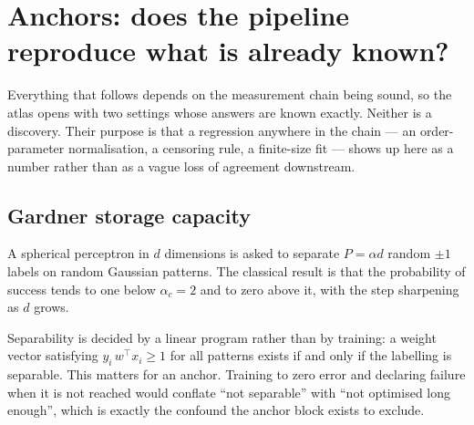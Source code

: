 \section{Anchors: does the pipeline reproduce what is already known?}
\label{sec:anchors}

Everything that follows depends on the measurement chain being sound, so the
atlas opens with two settings whose answers are known exactly. Neither is a
discovery. Their purpose is that a regression anywhere in the chain --- an
order-parameter normalisation, a censoring rule, a finite-size fit --- shows up
here as a number rather than as a vague loss of agreement downstream.

\subsection{Gardner storage capacity}

A spherical perceptron in $d$ dimensions is asked to separate $P=\alpha d$
random $\pm1$ labels on random Gaussian patterns. The classical result is that
the probability of success tends to one below $\alpha_c=2$ and to zero above
it, with the step sharpening as $d$ grows.

Separability is decided by a linear program rather than by training: a weight
vector satisfying $y_i\,w^\top x_i\ge1$ for all patterns exists if and only if
the labelling is separable. This matters for an anchor. Training to zero error
and declaring failure when it is not reached would conflate ``not separable''
with ``not optimised long enough'', which is exactly the confound the anchor
block exists to exclude.


